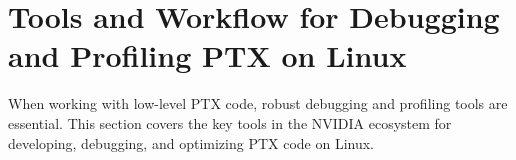 \section{Tools and Workflow for Debugging and Profiling PTX on Linux}

When working with low-level PTX code, robust debugging and profiling tools are essential. This section covers the key tools in the NVIDIA ecosystem for developing, debugging, and optimizing PTX code on Linux.

